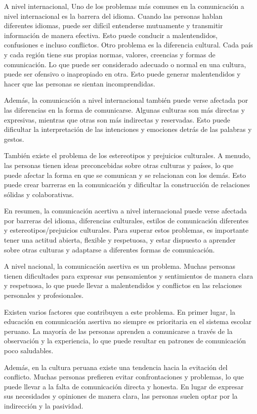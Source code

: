 \documentclass[12pt,a4paper]{article}
\begin{document}
A nivel internacional, Uno de los problemas más comunes en la comunicación a nivel internacional es la barrera del idioma. Cuando las personas hablan diferentes idiomas, puede ser difícil entenderse mutuamente y transmitir información de manera efectiva. Esto puede conducir a malentendidos, confusiones e incluso conflictos.
Otro problema es la diferencia cultural. Cada país y cada región tiene sus propias normas, valores, creencias y formas de comunicación. Lo que puede ser considerado adecuado o normal en una cultura, puede ser ofensivo o inapropiado en otra. Esto puede generar malentendidos y hacer que las personas se sientan incomprendidas.

Además, la comunicación a nivel internacional también puede verse afectada por las diferencias en la forma de comunicarse. Algunas culturas son más directas y expresivas, mientras que otras son más indirectas y reservadas. Esto puede dificultar la interpretación de las intenciones y emociones detrás de las palabras y gestos.

También existe el problema de los estereotipos y prejuicios culturales. A menudo, las personas tienen ideas preconcebidas sobre otras culturas y países, lo que puede afectar la forma en que se comunican y se relacionan con los demás. Esto puede crear barreras en la comunicación y dificultar la construcción de relaciones sólidas y colaborativas.

En resumen, la comunicación acertiva a nivel internacional puede verse afectada por barreras del idioma, diferencias culturales, estilos de comunicación diferentes y estereotipos/prejuicios culturales. Para superar estos problemas, es importante tener una actitud abierta, flexible y respetuosa, y estar dispuesto a aprender sobre otras culturas y adaptarse a diferentes formas de comunicación.

A nivel nacional, la comunicación asertiva es un problema. Muchas personas tienen dificultades para expresar sus pensamientos y sentimientos de manera clara y respetuosa, lo que puede llevar a malentendidos y conflictos en las relaciones personales y profesionales.

Existen varios factores que contribuyen a este problema. En primer lugar, la educación en comunicación asertiva no siempre es prioritaria en el sistema escolar peruano. La mayoría de las personas aprenden a comunicarse a través de la observación y la experiencia, lo que puede resultar en patrones de comunicación poco saludables.

Además, en la cultura peruana existe una tendencia hacia la evitación del conflicto. Muchas personas prefieren evitar confrontaciones y problemas, lo que puede llevar a la falta de comunicación directa y honesta. En lugar de expresar sus necesidades y opiniones de manera clara, las personas suelen optar por la indirección y la pasividad.
\end{document}
